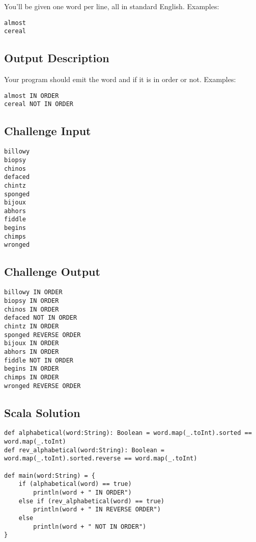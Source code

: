 You'll be given one word per line, all in standard English. Examples:

\begin{verbatim}
almost
cereal
\end{verbatim}

\subsection{Output Description}\label{output-description-3}

Your program should emit the word and if it is in order or not.
Examples:

\begin{verbatim}
almost IN ORDER
cereal NOT IN ORDER
\end{verbatim}

\subsection{Challenge Input}\label{challenge-input-4}

\begin{verbatim}
billowy
biopsy
chinos
defaced
chintz
sponged
bijoux
abhors
fiddle
begins
chimps
wronged
\end{verbatim}

\subsection{Challenge Output}\label{challenge-output-3}

\begin{verbatim}
billowy IN ORDER
biopsy IN ORDER
chinos IN ORDER
defaced NOT IN ORDER
chintz IN ORDER
sponged REVERSE ORDER 
bijoux IN ORDER
abhors IN ORDER
fiddle NOT IN ORDER
begins IN ORDER
chimps IN ORDER
wronged REVERSE ORDER
\end{verbatim}

\subsection{Scala Solution}\label{scala-solution-4}

\begin{verbatim}
def alphabetical(word:String): Boolean = word.map(_.toInt).sorted == word.map(_.toInt)
def rev_alphabetical(word:String): Boolean = word.map(_.toInt).sorted.reverse == word.map(_.toInt)

def main(word:String) = {
    if (alphabetical(word) == true) 
        println(word + " IN ORDER")
    else if (rev_alphabetical(word) == true) 
        println(word + " IN REVERSE ORDER")        
    else
        println(word + " NOT IN ORDER")
}
\end{verbatim}

